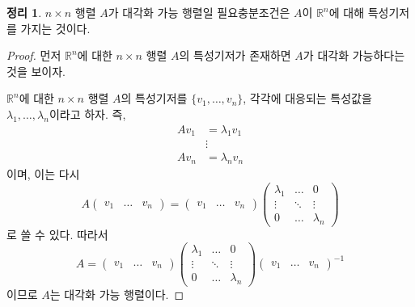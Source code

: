 \documentclass[unfonts,oneside,a4paper]{oblivoir}
\theoremstyle{definition}
\theoremstyle{theorem}
\newtheorem{theorem}[definition]{정리}
\theoremstyle{theorem}
\theoremstyle{remark}
\theoremstyle{remark}
\theoremstyle{remark}
\theoremstyle{remark}
\renewcommand{\vec}[1]{\bm{\mathit{#1}}}
\begin{document}
\begin{theorem}
    $n \times n$ 행렬 $A$가 대각화 가능 행렬일 필요충분조건은 $A$이 $\mathbb R^n$에 대해 특성기저를 가지는 것이다.
\end{theorem}

\begin{proof}
    먼저 $\mathbb R^n$에 대한 $n \times n$ 행렬 $A$의 특성기저가 존재하면 $A$가 대각화 가능하다는 것을 보이자.

    $\mathbb R^n$에 대한 $n \times n$ 행렬 $A$의 특성기저를 $\{\vec v_1, \dots, \vec v_n\}$, 각각에 대응되는 특성값을 $\lambda_1, \dots, \lambda_n$이라고 하자.
    즉,
    \begin{align*}
        A\vec v_1 &= \lambda_1 \vec v_1\\
                  &\vdots\\
        A\vec v_n &= \lambda_n \vec v_n
    \end{align*}
    이며, 이는 다시
    \begin{equation*}
        A
        \begin{pmatrix}
            \vec v_1 & \dots & \vec v_n
        \end{pmatrix}
        =
        \begin{pmatrix}
            \vec v_1 & \dots & \vec v_n
        \end{pmatrix}
        \begin{pmatrix}
            \lambda_1 & \dots & 0\\
            \vdots & \ddots & \vdots\\
            0 & \dots & \lambda_n
        \end{pmatrix}
    \end{equation*}
    로 쓸 수 있다.
    따라서
    \begin{equation*}
        A
        =
        \begin{pmatrix}
            \vec v_1 & \dots & \vec v_n
        \end{pmatrix}
        \begin{pmatrix}
            \lambda_1 & \dots & 0\\
            \vdots & \ddots & \vdots\\
            0 & \dots & \lambda_n
        \end{pmatrix}
        \begin{pmatrix}
            \vec v_1 & \dots & \vec v_n
        \end{pmatrix}^{-1}
    \end{equation*}
    이므로 $A$는 대각화 가능 행렬이다.


\end{proof}
\end{document}
